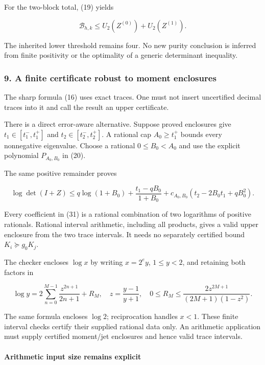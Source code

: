 For the two-block total, (19) yields

\[
 \mathcal B_{h,k}\le U_2(Z^{(0)})+U_2(Z^{(1)}).
\]

The inherited lower threshold remains four. No new purity conclusion is inferred from finite positivity or the optimality of a generic determinant inequality.

\subsubsection{9. A finite certificate robust to moment enclosures}\label{endpoint-relation_moment_original--a-finite-certificate-robust-to-moment-enclosures}

The sharp formula (16) uses exact traces. One must not insert uncertified decimal traces into it and call the result an upper certificate.

There is a direct error-aware alternative. Suppose proved enclosures give \(t_1\in[t_1^-,t_1^+]\) and \(t_2\in[t_2^-,t_2^+]\). A rational cap \(A_0\ge t_1^+\) bounds every nonnegative eigenvalue. Choose a rational \(0\le B_0<A_0\) and use the explicit polynomial \(P_{A_0,B_0}\) in (20).

The same positive remainder proves

\[
 \log\det(I+Z)\le
 q\log(1+B_0)+\frac{t_1-qB_0}{1+B_0}
 +c_{A_0,B_0}(t_2-2B_0t_1+qB_0^2).                            \tag{31}
\]

Every coefficient in (31) is a rational combination of two logarithms of positive rationals. Rational interval arithmetic, including all products, gives a valid upper enclosure from the two trace intervals. It needs no separately certified bound \(K_i\succeq g_0K_j\).

The checker encloses \(\log x\) by writing \(x=2^ey\), \(1\le y<2\), and retaining both factors in

\[
 \log y=2\sum_{n=0}^{M-1}\frac{z^{2n+1}}{2n+1}+R_M,
 \quad z=\frac{y-1}{y+1},\quad
 0\le R_M\le\frac{2z^{2M+1}}{(2M+1)(1-z^2)}.
\]

The same formula encloses \(\log2\); reciprocation handles \(x<1\). These finite interval checks certify their supplied rational data only. An arithmetic application must supply certified moment/jet enclosures and hence valid trace intervals.

\paragraph{Arithmetic input size remains explicit}\label{endpoint-relation_moment_original--arithmetic-input-size-remains-explicit}

